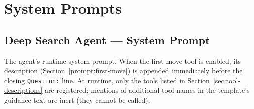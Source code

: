 %
%

\section{System Prompts}
\label{sec:system-prompts}

\subsection{Deep Search Agent --- System Prompt}
\label{prompt:agent}

The agent's runtime system prompt.  When the first-move tool is
enabled, its description (Section~\ref{prompt:first-move}) is appended
immediately before the closing {\tt Question:} line.  At runtime, only
the tools listed in Section~\ref{sec:tool-descriptions} are registered;
mentions of additional tool names in the template's guidance text are
inert (they cannot be called).

